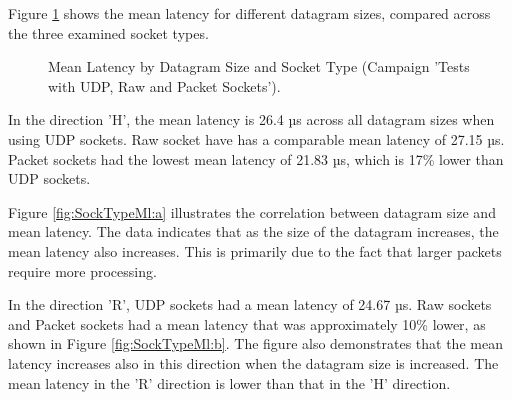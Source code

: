 Figure \ref{fig:SockTypeMl} shows the mean latency for different datagram sizes, compared across the three examined socket types.

\begin{figure}[h!]
  \centering
  \caption{Mean Latency by Datagram Size and Socket Type (Campaign 'Tests with UDP, Raw and Packet Sockets').}
  \label{fig:SockTypeMl}
\end{figure}

In the direction 'H', the mean latency is 26.4 µs across all datagram sizes when using UDP sockets. Raw socket have has a comparable mean latency of 27.15 µs. Packet sockets had the lowest mean latency of 21.83 µs, which is 17\% lower than UDP sockets.

Figure \ref{fig:SockTypeMl:a} illustrates the correlation between datagram size and mean latency. The data indicates that as the size of the datagram increases, the mean latency also increases. This is primarily due to the fact that larger packets require more processing.

In the direction 'R', UDP sockets had a mean latency of 24.67 µs. Raw sockets and Packet sockets had a mean latency that was approximately 10\% lower, as shown in Figure \ref{fig:SockTypeMl:b}. The figure also demonstrates that the mean latency increases also in this direction when the datagram size is increased. The mean latency in the 'R' direction is lower than that in the 'H' direction.

